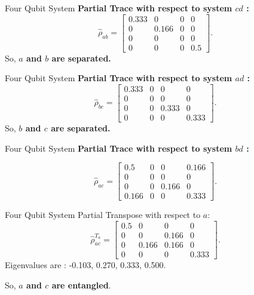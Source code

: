 \documentclass{beamer}
\begin{document}
\begin{frame}{Four Qubit System}
	\textbf{Partial Trace with respect to system $cd$ :}
	\begin{equation*}
		\hat{\rho}_{ab} = \left[\begin{matrix}0.333 & 0 & 0 & 0\\0 & 0.166 & 0 & 0\\0 & 0 & 0 & 0\\0 & 0 & 0 & 0.5\end{matrix}\right]
		.
	\end{equation*}
So, \textbf{$a$ and $b$ are separated.}
\end{frame}
\begin{frame}{Four Qubit System}
	\textbf{Partial Trace with respect to system $ad$ :}
	\begin{equation*}
		\hat{\rho}_{bc} = \left[\begin{matrix}0.333 & 0 & 0 & 0\\0 & 0 & 0 & 0\\0 & 0 & 0.333 & 0\\0 & 0 & 0 & 0.333\end{matrix}\right]
		.
	\end{equation*}
So, \textbf{$b$ and $c$ are separated.}
\end{frame}
\begin{frame}{Four Qubit System}
	\textbf{Partial Trace with respect to system $bd$ :}
	
	\begin{equation*}
		\hat{\rho}_{ac} = \left[\begin{matrix}0.5 & 0 & 0 & 0.166\\0 & 0 & 0 & 0\\0 & 0 & 0.166 & 0\\0.166 & 0 & 0 & 0.333\end{matrix}\right]
		.
	\end{equation*}
\end{frame}

\begin{frame}{Four Qubit System}
	Partial Transpose with respect to $a$:
	\begin{equation*}
		\hat{\rho}_{ac}^{T_a} = \left[\begin{matrix}0.5 & 0 & 0 & 0\\0 & 0 & 0.166 & 0\\0 & 0.166 & 0.166 & 0\\0 & 0 & 0 & 0.333\end{matrix}\right].
	\end{equation*}
Eigenvalues are : -0.103, 0.270, 0.333, 0.500.

So, \textbf{$a$ and $c$ are entangled}.
\end{frame}
\end{document}
